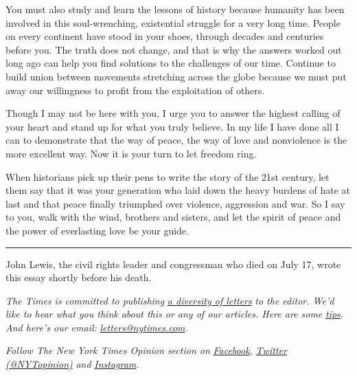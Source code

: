 You must also study and learn the lessons of history because humanity
has been involved in this soul-wrenching, existential struggle for a
very long time. People on every continent have stood in your shoes,
through decades and centuries before you. The truth does not change, and
that is why the answers worked out long ago can help you find solutions
to the challenges of our time. Continue to build union between movements
stretching across the globe because we must put away our willingness to
profit from the exploitation of others.

Though I may not be here with you, I urge you to answer the highest
calling of your heart and stand up for what you truly believe. In my
life I have done all I can to demonstrate that the way of peace, the way
of love and nonviolence is the more excellent way. Now it is your turn
to let freedom ring.

When historians pick up their pens to write the story of the 21st
century, let them say that it was your generation who laid down the
heavy burdens of hate at last and that peace finally triumphed over
violence, aggression and war. So I say to you, walk with the wind,
brothers and sisters, and let the spirit of peace and the power of
everlasting love be your guide.

\begin{center}\rule{0.5\linewidth}{\linethickness}\end{center}

John Lewis, the civil rights leader and congressman who died on July 17,
wrote this essay shortly before his death.

\emph{The Times is committed to publishing}
\href{https://slack-redir.net/link?url=https\%3A\%2F\%2Fwww.nytimes.com\%2F2019\%2F01\%2F31\%2Fopinion\%2Fletters\%2Fletters-to-editor-new-york-times-women.html}{\emph{a
diversity of letters}} \emph{to the editor. We'd like to hear what you
think about this or any of our articles. Here are some}
\href{https://slack-redir.net/link?url=https\%3A\%2F\%2Fhelp.nytimes.com\%2Fhc\%2Fen-us\%2Farticles\%2F115014925288-How-to-submit-a-letter-to-the-editor}{\emph{tips}}\emph{.
And here's our email:}
\href{mailto:letters@nytimes.com}{\emph{letters@nytimes.com}}\emph{.}

\emph{Follow The New York Times Opinion section on}
\href{https://slack-redir.net/link?url=https\%3A\%2F\%2Fwww.facebook.com\%2Fnytopinion}{\emph{Facebook}}\emph{,}
\href{https://slack-redir.net/link?url=http\%3A\%2F\%2Ftwitter.com\%2FNYTOpinion}{\emph{Twitter
(@NYTopinion)}} \emph{and}
\href{https://slack-redir.net/link?url=https\%3A\%2F\%2Fwww.instagram.com\%2Fnytopinion\%2F}{\emph{Instagram}}\emph{.}

